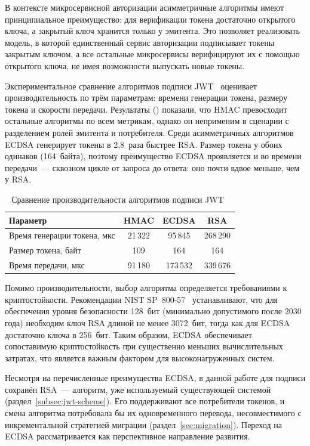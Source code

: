 В контексте микросервисной авторизации асимметричные алгоритмы
имеют принципиальное преимущество:
для верификации токена достаточно открытого ключа,
а закрытый ключ хранится только у эмитента.
Это позволяет реализовать модель,
в которой единственный сервис авторизации подписывает токены закрытым ключом,
а все остальные микросервисы верифицируют их с помощью открытого ключа,
не имея возможности выпускать новые токены.

Экспериментальное сравнение алгоритмов подписи JWT~\cite{Rahmatulloh2019}
оценивает производительность по трём параметрам:
времени генерации токена, размеру токена и скорости передачи.
Результаты () показали,
что HMAC превосходит остальные алгоритмы по всем метрикам,
однако он неприменим в сценарии с разделением ролей эмитента и потребителя.
Среди асимметричных алгоритмов ECDSA генерирует токены
в 2,8~раза быстрее RSA\@.
Размер токена у обоих одинаков (164~байта),
поэтому преимущество ECDSA проявляется и во времени передачи~---
сквозном цикле от запроса до ответа: оно почти вдвое меньше, чем у RSA\@.

\begin{table}[h]
  \centering
  \caption{Сравнение производительности алгоритмов подписи JWT~\cite{Rahmatulloh2019}}
  \label{tab:signing-perf}
  \begin{tabularx}{\textwidth}{X c c c}
    \hline
    \textbf{Параметр} & \textbf{HMAC} & \textbf{ECDSA} & \textbf{RSA} \\
    \hline
    Время генерации токена, мкс & 21\,322 & 95\,845 & 268\,290 \\
    Размер токена, байт          & 109     & 164     & 164      \\
    Время передачи, мкс          & 91\,180 & 173\,532 & 339\,676 \\
    \hline
  \end{tabularx}
\end{table}

Помимо производительности, выбор алгоритма определяется
требованиями к криптостойкости.
Рекомендации NIST SP~800-57~\cite{NIST80057} устанавливают,
что для обеспечения уровня безопасности 128~бит
(минимально допустимого после 2030 года) необходим ключ RSA
длиной не менее 3072~бит, тогда как для ECDSA достаточно ключа в 256~бит.
Таким образом, ECDSA обеспечивает сопоставимую криптостойкость
при существенно меньших вычислительных затратах,
что является важным фактором для высоконагруженных систем.

Несмотря на перечисленные преимущества ECDSA,
в данной работе для подписи сохранён RSA~--- алгоритм,
уже используемый существующей системой (раздел~\ref{subsec:jwt-scheme}).
Его поддерживают все потребители токенов,
и смена алгоритма потребовала бы их одновременного перевода,
несовместимого с инкрементальной стратегией миграции (раздел~\ref{sec:migration}).
Переход на ECDSA рассматривается как перспективное направление развития.

